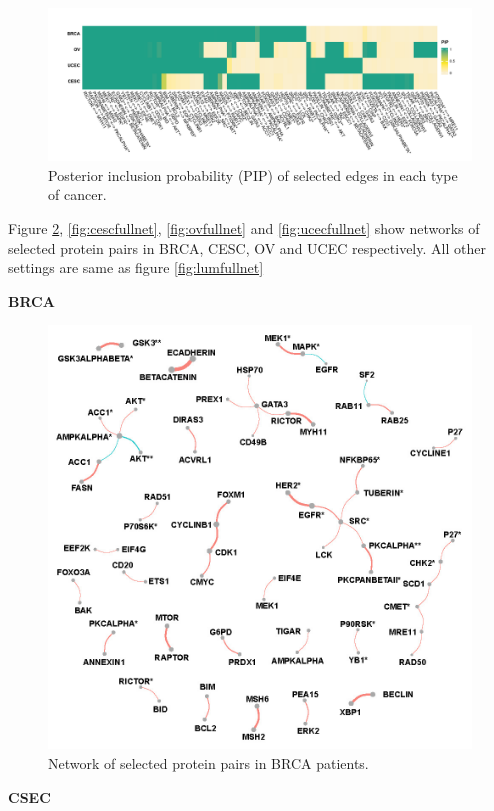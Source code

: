 \documentclass[
]{book}
\begin{document}
\begin{figure}

{\centering \includegraphics[width=0.9\linewidth]{images/pan_pip} 

}

\caption{Posterior inclusion probability (PIP) of selected edges in each type of cancer.}\label{fig:panpip}
\end{figure}

Figure \ref{fig:brcafullnet}, \ref{fig:cescfullnet}, \ref{fig:ovfullnet} and \ref{fig:ucecfullnet} show networks of selected protein pairs in BRCA, CESC, OV and UCEC respectively. All other settings are same as figure \ref{fig:lumfullnet}

\textbf{BRCA}

\begin{figure}

{\centering \includegraphics[width=0.7\linewidth]{images/pan_fullnet_brca} 

}

\caption{Network of selected protein pairs in BRCA patients.}\label{fig:brcafullnet}
\end{figure}

\textbf{CSEC}
\end{document}
